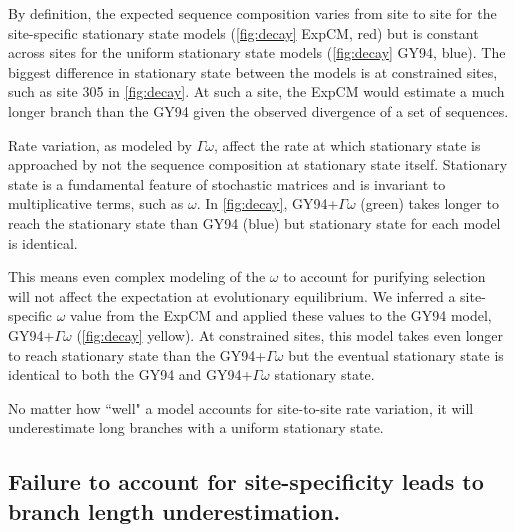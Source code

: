 \documentclass[11pt]{article}
\begin{document}
By definition, the expected sequence composition varies from site to site for the site-specific stationary state models (\ref{fig:decay} ExpCM, red) but is constant across sites for the uniform stationary state models (\ref{fig:decay} GY94, blue).
The biggest difference in stationary state between the models is at constrained sites, such as site 305 in \ref{fig:decay}. 
At such a site, the ExpCM would estimate a much longer branch than the GY94 given the observed divergence of a set of sequences. 

Rate variation, as modeled by $\Gamma\omega$, affect the rate at which stationary state is approached by not the sequence composition at stationary state itself. 
Stationary state is a fundamental feature of stochastic matrices and is invariant to multiplicative terms, such as $\omega$. 
In \ref{fig:decay}, GY94+$\Gamma\omega$ (green) takes longer to reach the stationary state than GY94 (blue) but stationary state for each model is identical. 

This means even complex modeling of the $\omega$ to account for purifying selection will not affect the expectation at evolutionary equilibrium. 
We inferred a site-specific $\omega$ value from the ExpCM \citep{spielman2015relationship} and applied these values to the GY94 model, GY94+$\Gamma\omega$ (\ref{fig:decay} yellow). 
At constrained sites, this model takes even longer to reach stationary state than the GY94+$\Gamma\omega$ but the eventual stationary state is identical to both the GY94 and GY94+$\Gamma\omega$ stationary state. 

No matter how ``well" a model accounts for site-to-site rate variation, it will underestimate long branches with a uniform stationary state. 

\subsection*{Failure to account for site-specificity leads to branch length underestimation.}
\end{document}
